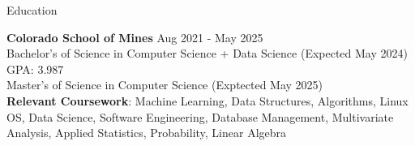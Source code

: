 \documentclass{resume} %
\begin{document}
\vspace{-10pt}

\begin{rSection}{Education}

{\bf Colorado School of Mines} \hfill {Aug 2021 - May 2025}\\
Bachelor's of Science in Computer Science + Data Science (Expected May 2024) \hfill {GPA: 3.987}\\
Master's of Science in Computer Science (Exptected May 2025)\\
\textbf{Relevant Coursework}: Machine Learning, Data Structures, Algorithms, Linux OS, Data Science, Software Engineering, Database Management, Multivariate Analysis, Applied Statistics, Probability, Linear Algebra



\end{rSection}
\vspace{-6pt}
\end{document}

